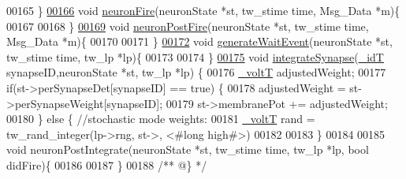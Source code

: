 \begin{DoxyCode}
00165 \}
\hypertarget{neuron_8c_source_l00166}{}\hyperlink{neuron_8h_ae071ef984b7e0dd4ec38fca91e0abe39}{00166} \textcolor{keywordtype}{void} \hyperlink{neuron_8h_ae071ef984b7e0dd4ec38fca91e0abe39}{neuronFire}(neuronState *st, tw\_stime time, Msg\_Data *m)\{
00167 
00168 \}
\hypertarget{neuron_8c_source_l00169}{}\hyperlink{neuron_8h_ab1f4997e4bfe11e78faa6d37748aee67}{00169} \textcolor{keywordtype}{void} \hyperlink{neuron_8h_ab1f4997e4bfe11e78faa6d37748aee67}{neuronPostFire}(neuronState *st, tw\_stime time, Msg\_Data *m)\{
00170 
00171 \}
\hypertarget{neuron_8c_source_l00172}{}\hyperlink{neuron_8h_a06ee765bfae45fe9b7f0619bf4abe63d}{00172} \textcolor{keywordtype}{void} \hyperlink{neuron_8h_a06ee765bfae45fe9b7f0619bf4abe63d}{generateWaitEvent}(neuronState *st, tw\_stime time, tw\_lp *lp)\{
00173 
00174 \}
\hypertarget{neuron_8c_source_l00175}{}\hyperlink{neuron_8h_ae630bdf5dd3744870968f07a6971659c}{00175} \textcolor{keywordtype}{void} \hyperlink{neuron_8h_ae630bdf5dd3744870968f07a6971659c}{integrateSynapse}(\hyperlink{assist_8h_a3f7a6e6a1210b6d9d7a42177dcb9634b}{\_idT} synapseID,neuronState *st, tw\_lp *lp) \{
00176     \hyperlink{assist_8h_abe1fc1b8f9efd1187e564bcb8de7f815}{\_voltT} adjustedWeight;
00177     \textcolor{keywordflow}{if}(st->perSynapseDet[synapseID] == \textcolor{keyword}{true}) \{
00178         adjustedWeight = st->perSynapseWeight[synapseID];
00179         st->membranePot += adjustedWeight;
00180     \} \textcolor{keywordflow}{else} \{ \textcolor{comment}{//stochastic mode weights:}
00181         \hyperlink{assist_8h_abe1fc1b8f9efd1187e564bcb8de7f815}{\_voltT} rand = tw\_rand\_integer(lp->rng, st->, <#\textcolor{keywordtype}{long} high#>)
00182 
00183 \}
00184 
00185 \textcolor{keywordtype}{void} neuronPostIntegrate(neuronState *st, tw\_stime time, tw\_lp *lp, \textcolor{keywordtype}{bool} didFire)\{
00186 
00187 \}
00188 \textcolor{comment}{/** @\} */}
\end{DoxyCode}

